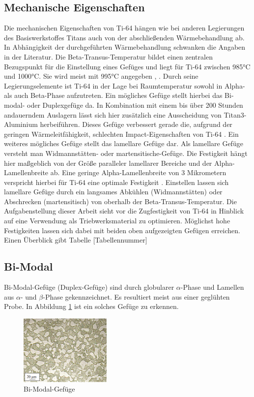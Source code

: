 \documentclass[a4paper, 11pt]{tubsreprt}
\begin{document}
\subsection{Mechanische Eigenschaften}
Die mechanischen Eigenschaften von Ti-64 hängen wie bei anderen Legierungen des Basiswerkstoffes Titans auch von der abschließenden Wärmebehandlung ab. In Abhängigkeit der durchgeführten Wärmebehandlung schwanken die Angaben in der Literatur. Die Beta-Transus-Temperatur bildet einen zentralen Bezugspunkt für die Einstellung eines Gefüges und liegt für Ti-64 zwischen 985°C und 1000°C. Sie wird meist mit 995°C angegeben \cite{Semiatin2003}, \cite{Chen2008}. Durch seine Legierungselemente ist Ti-64 in der Lage bei Raumtemperatur sowohl in Alpha- als auch Beta-Phase aufzutreten.
Ein mögliches Gefüge stellt hierbei das Bi-modal- oder Duplexgefüge da. In Kombination mit einem bis über 200 Stunden andauerndem Auslagern lässt sich hier zusätzlich eine Ausscheidung von Titan3-Aluminium herbeiführen. Dieses Gefüge verbessert gerade die, aufgrund der geringen Wärmeleitfähigkeit, schlechten Impact-Eigenschaften von Ti-64 \cite{Semiatin2003}.
Ein weiteres mögliches Gefüge stellt das lamellare Gefüge dar. Als lamellare Gefüge versteht man Widmannstätten- oder martensitische-Gefüge. Die Festigkeit hängt hier maßgeblich von der Größe paralleler lamellarer Bereiche und der Alpha-Lamellenbreite ab. Eine geringe Alpha-Lamellenbreite von 3 Mikrometern verspricht hierbei für Ti-64 eine optimale Festigkeit \cite{Sieniawski2013}. Einstellen lassen sich lamellare Gefüge durch ein langsames Abkühlen (Widmannstätten) oder Abschrecken (martensitisch) von oberhalb der Beta-Transus-Temperatur. 
Die Aufgabenstellung dieser Arbeit sieht vor die Zugfestigkeit von Ti-64 in Hinblick auf eine Verwendung als Triebwerksmaterial zu optimieren. Möglichst hohe Festigkeiten lassen sich dabei mit beiden oben aufgezeigten Gefügen erreichen. Einen Überblick gibt Tabelle [Tabellennummer]
\subsection{Bi-Modal}
Bi-Modal-Gefüge (Duplex-Gefüge) sind durch globularer $\alpha$-Phase und Lamellen aus $\alpha$- und $\beta$-Phase gekennzeichnet. Es resultiert meist aus einer geglühten Probe.  In Abbildung \ref{bimodal} ist ein solches Gefüge zu erkennen. 
\begin{figure}
\centering
\includegraphics[width=0.4\textwidth]{Bilder/Duplexgefuege.PNG}
\caption[Bi-Modal-Gefüge]{Bi-Modal-Gefüge\cite{Werkstoffdesign2012}}
\label{bimodal}
\end{figure}
\end{document}
